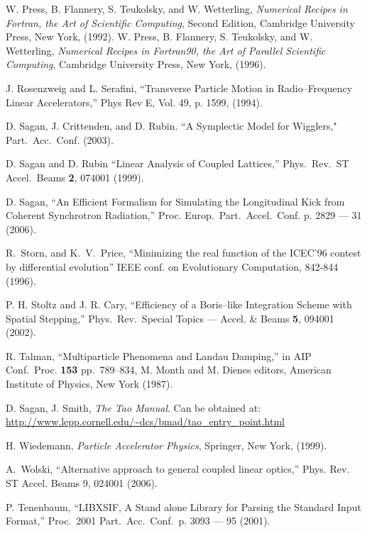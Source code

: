 \begin{thebibliography}{XXX99}
W. Press, B. Flannery, S. Teukolsky, and W. Wetterling, {\em Numerical
Recipes in Fortran, the Art of Scientific Computing}, Second Edition,
Cambridge University Press, New York, (1992). \hfill \break
W. Press, B. Flannery, S. Teukolsky, and W. Wetterling, {\em Numerical
Recipes in Fortran90, the Art of Parallel Scientific Computing}, 
Cambridge University Press, New York, (1996).

J. Rosenzweig and L. Serafini, ``Transverse Particle Motion in
Radio--Frequency Linear Accelerators,'' Phys Rev E, Vol. 49, p. 1599,
(1994).

D. Sagan, J. Crittenden, and D. Rubin.
``A Symplectic Model for Wigglers," Part.\ Acc.\ Conf. (2003).

D. Sagan and D. Rubin ``Linear Analysis of Coupled Lattices,''
Phys.\ Rev.\ ST Accel.\ Beams {\bf 2}, 074001 (1999).

D. Sagan, ``An Efficient Formalism for Simulating the Longitudinal Kick from Coherent 
Synchrotron Radiation,'' Proc. Europ.\ Part.\ Accel.\ Conf. p. 2829 --- 31 (2006).

R.~Storn, and K.~V.~Price, ``Minimizing the real function of the
ICEC'96 contest by differential evolution'' IEEE conf. on Evolutionary
Computation, 842-844 (1996).

P. H. Stoltz and J. R. Cary, ``Efficiency of a Boris--like Integration
Scheme with Spatial Stepping,'' Phys.\ Rev.\ Special Topics ---
Accel. \& Beams {\bf 5}, 094001 (2002).

R. Talman, ``Multiparticle Phenomena and Landau Damping,'' in AIP Conf.\ Proc.
{\bf 153} pp.~789--834, M. Month and M. Dienes editors, American Institute of
Physics, New York (1987). 

D. Sagan, J. Smith, {\it The Tao Manual}.
Can be obtained at: \hfill\break
\hspace*{0.3in}
\url{http://www.lepp.cornell.edu/~dcs/bmad/tao_entry_point.html}

H. Wiedemann, {\em Particle Accelerator Physics}, Springer, New York, (1999). 

A.~Wolski,  ``Alternative approach to general coupled linear optics,''
Phys. Rev. ST Accel. Beams 9, 024001 (2006).

P. Tenenbaum, ``LIBXSIF, A Stand alone Library for Parsing the Standard 
Input Format,'' Proc.\ 2001 Part.\ Acc.\ Conf.\ p. 3093 --- 95 (2001).

\end{thebibliography}
